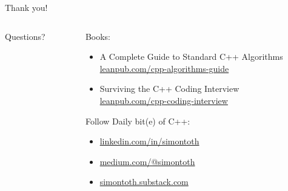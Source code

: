 \documentclass[aspectratio=169]{beamer}
\begin{document}
\begin{frame}[c]
\Huge
\begin{center}
Thank you!
\end{center}
\end{frame}

\begin{frame}[c]
    \begin{columns}
        \begin{column}{0.35\textwidth}
            \Huge
            Questions?
        \end{column}
        \begin{column}{0.6\textwidth}
            Books:
            \begin{itemize}
                \item A Complete Guide to Standard C++ Algorithms\\
                    \href{https://leanpub.com/cpp-algorithms-guide}{leanpub.com/cpp-algorithms-guide}
                \item Surviving the C++ Coding Interview\\
                    \href{https://leanpub.com/cpp-coding-interview}{leanpub.com/cpp-coding-interview}
            \end{itemize}
            Follow Daily bit(e) of C++:
            \begin{itemize}
                \item \href{https://www.linkedin.com/in/simontoth/}{linkedin.com/in/simontoth}
                \item \href{https://medium.com/@simontoth}{medium.com/@simontoth}
                \item \href{https://simontoth.substack.com}{simontoth.substack.com}
            \end{itemize}
        \end{column}
    \end{columns}
\end{frame}
\end{document}
